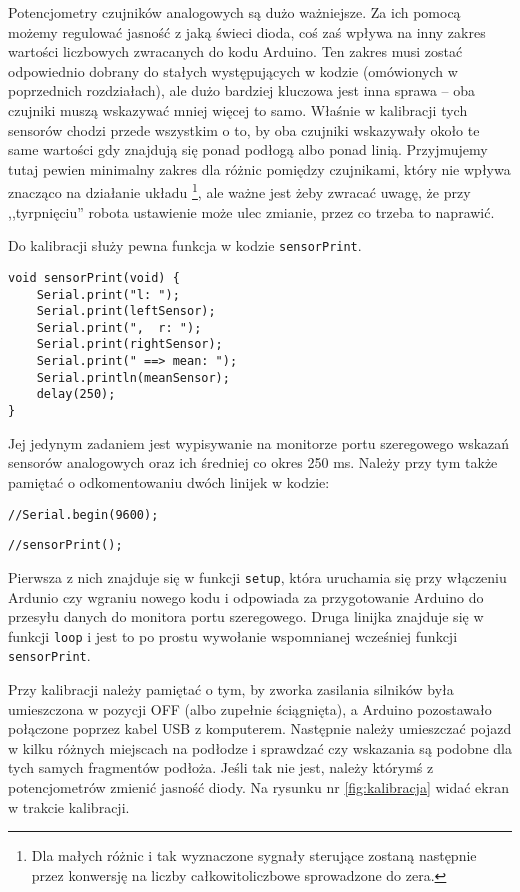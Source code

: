 \documentclass[11pt]{article}
\begin{document}
Potencjometry czujników analogowych są dużo ważniejsze. Za ich pomocą możemy regulować jasność z jaką świeci dioda, coś zaś wpływa na inny zakres wartości liczbowych zwracanych do kodu Arduino. Ten zakres musi zostać odpowiednio dobrany do stałych występujących w kodzie (omówionych w poprzednich rozdziałach), ale dużo bardziej kluczowa jest inna sprawa -- oba czujniki muszą wskazywać mniej więcej to samo. Właśnie w kalibracji tych sensorów chodzi przede wszystkim o to, by oba czujniki wskazywały około te same wartości gdy znajdują się ponad podłogą albo ponad linią. Przyjmujemy tutaj pewien minimalny zakres dla różnic pomiędzy czujnikami, który nie wpływa znacząco na działanie układu%
\footnote{Dla małych różnic i tak wyznaczone sygnały sterujące zostaną następnie przez konwersję na liczby całkowitoliczbowe sprowadzone do zera.}, ale ważne jest żeby zwracać uwagę, że przy ,,tyrpnięciu'' robota ustawienie może ulec zmianie, przez co trzeba to naprawić.

Do kalibracji służy pewna funkcja w kodzie \texttt{sensorPrint}.
\begin{lstlisting}[firstnumber = 164]
void sensorPrint(void) {
    Serial.print("l: ");
    Serial.print(leftSensor);
    Serial.print(",  r: ");
    Serial.print(rightSensor);
    Serial.print(" ==> mean: ");
    Serial.println(meanSensor);
    delay(250);
}
\end{lstlisting}

Jej jedynym zadaniem jest wypisywanie na monitorze portu szeregowego wskazań sensorów analogowych oraz ich średniej co okres 250 ms. Należy przy tym także pamiętać o odkomentowaniu dwóch linijek w kodzie:
\begin{lstlisting}[firstnumber = 43]
//Serial.begin(9600);
\end{lstlisting}

\begin{lstlisting}[firstnumber = 138]
//sensorPrint();
\end{lstlisting}

Pierwsza z nich znajduje się w funkcji \texttt{setup}, która uruchamia się przy włączeniu Ardunio czy wgraniu nowego kodu i odpowiada za przygotowanie Arduino do przesyłu danych do monitora portu szeregowego. Druga linijka znajduje się w funkcji \texttt{loop} i jest to po prostu wywołanie wspomnianej wcześniej funkcji \texttt{sensorPrint}.

Przy kalibracji należy pamiętać o tym, by zworka zasilania silników była umieszczona w pozycji OFF (albo zupełnie ściągnięta), a Arduino pozostawało połączone poprzez kabel USB z komputerem. Następnie należy umieszczać pojazd w kilku różnych miejscach na podłodze i sprawdzać czy wskazania są podobne dla tych samych fragmentów podłoża. Jeśli tak nie jest, należy którymś z potencjometrów zmienić jasność diody. Na rysunku nr \ref{fig:kalibracja} widać ekran w trakcie kalibracji.
\end{document}
